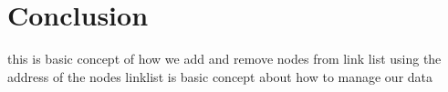 \documentclass[11pt]{article}            %
\begin{document}
\section{Conclusion}  
this is basic concept of how we add and remove nodes from link list using the address of the nodes linklist is basic concept about how to manage our data
\end{document}
